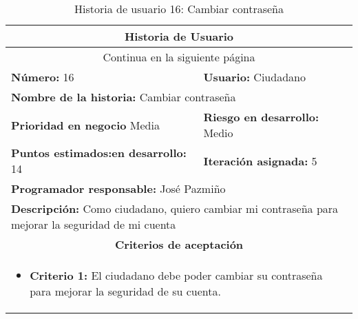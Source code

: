 

\begin{longtable}{|p{6.7cm}|p{6.7cm}|}
    \caption{Historia de usuario 16: Cambiar contraseña} \label{tab:historia-16}
    \\
    \hline
    \multicolumn{2}{|c|}{\textbf{Historia de Usuario}}                                                                                      \\
    \hline

    \endfirsthead

    \hline
    \endhead

    \hline
    \multicolumn{2}{|c|}{{Continua en la siguiente página}}                                                                                 \\
    \hline
    \endfoot

    \hline
    \endlastfoot

    \textbf{Número:} 16                                  & \textbf{Usuario:} Ciudadano                                                      \\
    \hline
    \multicolumn{2}{|l|}{\textbf{Nombre de la historia:} Cambiar contraseña}                                                                \\
    \hline
    \textbf{Prioridad en negocio}  Media                 & \textbf{Riesgo en desarrollo:} Medio                                             \\
    \hline
    \textbf{\textbf{Puntos estimados:}en desarrollo:} 14 & \textbf{Iteración asignada:} 5                                                   \\
    \hline
    \multicolumn{2}{|l|}{\textbf{Programador responsable:} José Pazmiño }                                                                   \\
    \hline
    \multicolumn{2}{|p{13.4cm}|}{\textbf{Descripción:} Como ciudadano, quiero cambiar mi contraseña para mejorar la seguridad de mi cuenta} \\
    \hline
    \multicolumn{2}{|c|}{\textbf{Criterios de aceptación}}                                                                                  \\
    \hline
    \multicolumn{2}{|p{13.4cm}|}{
    \begin{itemize}[label={},leftmargin=*, nosep]
        \item \textbf{Criterio 1:} El ciudadano debe poder cambiar su contraseña para mejorar la seguridad de su cuenta.
    \end{itemize}
    }
    \\
\end{longtable}



